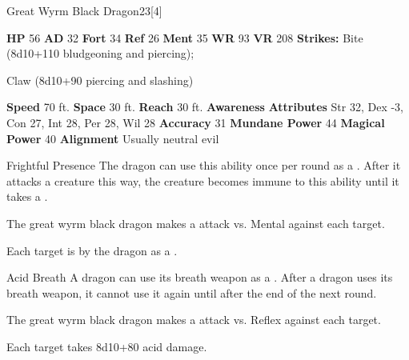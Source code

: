   \begin{monsubsection}{Great Wyrm Black Dragon}{23}[4]
    \vspace{-1em}\vspace{-1em}
    \vspace{0em}

    
    

    \begin{spellcontent}
      \begin{spelltargetinginfo}
        \pari \textbf{HP} 56 \monsep
          \textbf{AD} 32 \monsep
          \textbf{Fort} 34 \monsep
          \textbf{Ref} 26 \monsep
          \textbf{Ment} 35
        \pari \textbf{WR} 93 \monsep
        \textbf{VR} 208
        \pari \textbf{Strikes:}
            Bite  (8d10+110 bludgeoning and piercing);
\par Claw  (8d10+90 piercing and slashing)
      \end{spelltargetinginfo}
    \end{spellcontent}
    \begin{monsterfooter}
      \pari \textbf{Speed} 70 ft. \monsep
        \textbf{Space} 30 ft. \monsep
        \textbf{Reach} 30 ft.
      \pari \textbf{Awareness} 
      \pari \textbf{Attributes}
        Str 32, Dex -3,
        Con 27, Int 28,
        Per 28, Wil 28
      \pari \textbf{Accuracy} 31 \monsep
        \textbf{Mundane Power} 44 \monsep
      \textbf{Magical Power} 40
      \pari \textbf{Alignment} Usually neutral evil
    \end{monsterfooter}
  \end{monsubsection}
  \begin{freeability}{Frightful Presence}
      The dragon can use this ability once per round as a .
      After it attacks a creature this way, the creature becomes immune to this ability until it takes a .
      \par The great wyrm black dragon makes a  attack
        vs. Mental against each target.
    
    \hit Each target is  by the dragon as a .
    \end{freeability}
  

    \begin{freeability}{Acid Breath}
      A dragon can use its breath weapon as a .
      After a dragon uses its breath weapon, it cannot use it again until after the end of the next round.
      \par The great wyrm black dragon makes a  attack
        vs. Reflex against each target.
    
    \hit Each target takes 8d10+80 acid damage.
    \end{freeability}
  
